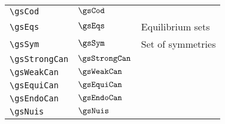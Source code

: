 \begin{longtable}{lll}
 {\color[rgb]{0.5,0.5,0.5}\texttt{\textbackslash gsCod}} & $\gsCod$ &  \\ 
 {\color[rgb]{0.5,0.5,0.5}\texttt{\textbackslash gsEqs}} & $\gsEqs$ &  Equilibrium sets\\ 
 {\color[rgb]{0.5,0.5,0.5}\texttt{\textbackslash gsSym}} & $\gsSym$ &  Set of symmetries\\ 
 {\color[rgb]{0.5,0.5,0.5}\texttt{\textbackslash gsStrongCan}} & $\gsStrongCan$ &  \\ 
 {\color[rgb]{0.5,0.5,0.5}\texttt{\textbackslash gsWeakCan}} & $\gsWeakCan$ &  \\ 
 {\color[rgb]{0.5,0.5,0.5}\texttt{\textbackslash gsEquiCan}} & $\gsEquiCan$ &  \\ 
 {\color[rgb]{0.5,0.5,0.5}\texttt{\textbackslash gsEndoCan}} & $\gsEndoCan$ &  \\ 
 {\color[rgb]{0.5,0.5,0.5}\texttt{\textbackslash gsNuis}} & $\gsNuis$ &  \\ 
 \end{longtable}

